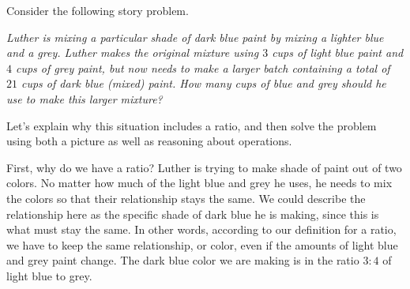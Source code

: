 \documentclass{ximera}
\begin{document}
\begin{example}
Consider the following story problem.

\emph{Luther is mixing a particular shade of dark blue paint by mixing a lighter blue and a grey. Luther makes the original mixture using $3$ cups of light blue paint and $4$ cups of grey paint, but now needs to make a larger batch containing a total of $21$ cups of dark blue (mixed) paint. How many cups of blue and grey should he use to make this larger mixture?}

Let's explain why this situation includes a ratio, and then solve the problem using both a picture as well as reasoning about operations. 

First, why do we have a ratio? Luther is trying to make  shade of paint out of two colors. No matter how much of the light blue and grey he uses, he needs to mix the colors so that their relationship stays the same. We could describe the relationship here as the specific shade of dark blue he is making, since this is what must stay the same. In other words, according to our definition for a ratio, we have to keep the same relationship, or color, even if the amounts of light blue and grey paint change. The dark blue color we are making is in the ratio $3:4$ of light blue to grey. 


\end{example}
\end{document}
